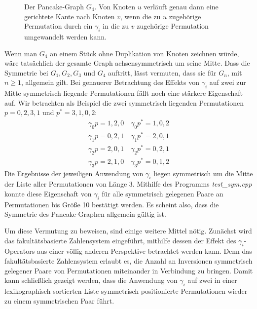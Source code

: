\documentclass[a4paper, 11pt, ngerman]{article}
\begin{document}
\begin{figure}
    \caption{Der Pancake-Graph $G_4$. Von Knoten $u$ verläuft genau dann eine gerichtete Kante nach Knoten $v$, wenn die zu $u$ zugehörige Permutation durch ein $\gamma_i$ in die zu $v$ zugehörige Permutation umgewandelt werden kann.}
\end{figure}
\newpage

Wenn man $G_4$ an einem Stück ohne Duplikation von Knoten zeichnen würde, wäre tatsächlich der gesamte Graph achsensymmetrisch um seine Mitte. Dass die Symmetrie bei $G_1, G_2, G_3$ und $G_4$ auftritt, lässt vermuten, dass sie für $G_n$, mit $n \ge 1$, allgemein gilt.
Bei genauerer Betrachtung des Effekts von $\gamma_i$ auf zwei zur Mitte symmetrisch liegende Permutationen fällt noch eine stärkere Eigenschaft auf. Wir betrachten als Beispiel die zwei symmetrisch liegenden Permutationen $p = 0,2,3,1$ und $p^* = 3, 1, 0, 2$:
\begin{align*}
    \gamma_0 p = 1, 2, 0 \quad \gamma_0 p^* = 1, 0, 2 \\
    \gamma_1 p = 0, 2, 1 \quad \gamma_1 p^* = 2, 0, 1 \\
    \gamma_2 p = 2, 0, 1 \quad \gamma_2 p^* = 0, 2, 1 \\
    \gamma_3 p = 2, 1, 0 \quad \gamma_3 p^* = 0, 1, 2
\end{align*}
Die Ergebnisse der jeweiligen Anwendung von $\gamma_i$ liegen symmetrisch um die Mitte der Liste aller Permutationen von Länge 3. Mithilfe des Programms \emph{test\_sym.cpp} konnte diese Eigenschaft von $\gamma_i$ für alle symmetrisch gelegenen Paare an Permutationen bis Größe 10 bestätigt werden. Es scheint also, dass die Symmetrie des Pancake-Graphen allgemein gültig ist.

Um diese Vermutung zu beweisen, sind einige weitere Mittel nötig. Zunächst wird das fakultätsbasierte Zahlensystem eingeführt, mithilfe dessen der Effekt des $\gamma_i$-Operators aus einer völlig anderen Perspektive betrachtet werden kann. Denn das fakultätsbasierte Zahlensystem erlaubt es, die Anzahl an Inversionen symmetrisch gelegener Paare von Permutationen miteinander in Verbindung zu bringen. Damit kann schließlich gezeigt werden, dass die Anwendung von $\gamma_i$ auf zwei in einer lexikographisch sortierten Liste symmetrisch positionierte Permutationen wieder zu einem symmetrischen Paar führt.
\bigskip
\end{document}
